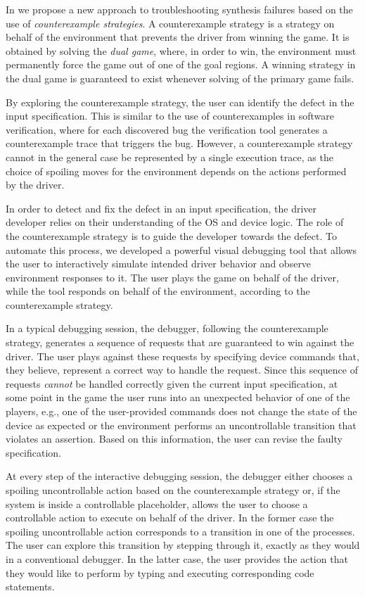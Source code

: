 In \termite we propose a new approach to troubleshooting synthesis failures based on the use of \emph{counterexample strategies}.  A counterexample strategy is a strategy on behalf of the environment that prevents the driver from winning the game.  It is obtained by solving the \emph{dual game}, where, in order to win, the environment must permanently force the game out of one of the goal regions.  A winning strategy in the dual game is guaranteed to exist whenever solving of the primary game fails.

By exploring the counterexample strategy, the user can identify the defect in the input specification.  This is similar to the use of counterexamples in software verification, where for each discovered bug the verification tool generates a counterexample trace that triggers the bug.  However, a counterexample strategy cannot in the general case be represented by a single execution trace, as the choice of spoiling moves for the environment depends on the actions performed by the driver.

In order to detect and fix the defect in an input specification, the driver developer relies on their  understanding of the OS and device logic.  The role of the counterexample strategy is to guide the developer towards the defect.  To automate this process, we developed a powerful visual debugging tool that allows the user to interactively simulate intended driver behavior and observe environment responses to it.  The user plays the game on behalf of the driver, while the tool responds on behalf of the environment, according to the counterexample strategy.
 
In a typical debugging session, the debugger, following the counterexample strategy, generates a sequence of requests that are guaranteed to win against the driver.  The user plays against these requests by specifying device commands that, they believe, represent a correct way to handle the request.  Since this sequence of requests \emph{cannot} be handled correctly given the current input specification, at some point in the game the user runs into an unexpected behavior of one of the players, e.g., one of the user-provided commands does not change the state of the device as expected or the environment performs an uncontrollable transition that violates an assertion.  Based on this information, the user can revise the faulty specification.

At every step of the interactive debugging session, the debugger either chooses a spoiling uncontrollable action based on the counterexample strategy or, if the system is inside a controllable placeholder, allows the user to choose a controllable action to execute on behalf of the driver.  In the former case the spoiling uncontrollable action corresponds to a transition in one of the \tsl processes.  The user can explore this transition by stepping through it, exactly as they would in a conventional debugger.  In the latter case, the user provides the action that they would like to perform by typing and executing corresponding code statements.

